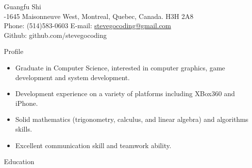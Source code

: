 \documentclass[10pt]{article}
\newenvironment{myitemize}{\begin{itemize} %
        \setlength{\itemsep}{0.25em} 
        \setlength{\topsep}{\itemsep} 
        \setlength{\labelsep}{1em}
        \setlength{\parskip}{0em}
        \setlength{\partopsep}{0em}
}%
{ \end{itemize} }
\begin{document}
 
\date{}
\newlength{\oldcvlabelwidth}
\newlength{\oldcvlabelsep}



\begin{cv} {{\large Guangfu Shi}\\
    { \normalsize {}-1645 Maisonneuve West, Montreal, Quebec, Canada. H3H 2A8\\ 
    Phone: {\mdseries (514)583-0603}  
    \hfill E-mail: {\mdseries \href{mailto:stevegocoding@gmail.com} {stevegocoding@gmail.com}} \\
	Github: github.com/stevegocoding 
    }
}


\setlength{\oldcvlabelwidth}{\cvlabelwidth}
\setlength{\oldcvlabelsep}{\cvlabelsep}
\setlength{\cvlabelwidth}{0.5em}

%

\begin{cvlist}{Profile} 
\item
    \begin{myitemize}
        \item Graduate in Computer Science, interested in computer graphics, game development and system development.
        \item Development experience on a variety of platforms including XBox360 and iPhone.
        \item Solid mathematics (trigonometry, calculus, and linear algebra) and algorithms skills. 
        \item Excellent communication skill and teamwork ability. 

    \end{myitemize}
\end{cvlist}


\setlength{\cvlabelwidth}{1em}

\begin{cvlist}{Education}
    

\end{cvlist}
\end{cv}
\end{document}
